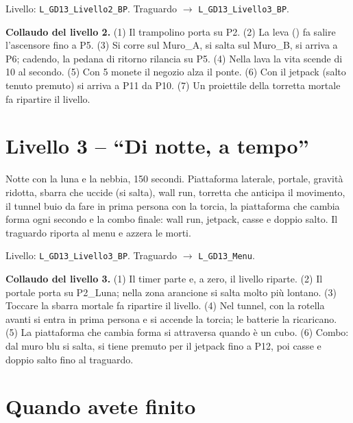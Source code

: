 \documentclass[a4paper,10pt]{article}
\newcommand{\var}[1]{\texttt{#1}}
\newcommand{\tasto}[1]{\fbox{\footnotesize\textsf{#1}}}
\begin{document}
Livello: \var{L\_GD13\_Livello2\_BP}. Traguardo $\rightarrow$ \var{L\_GD13\_Livello3\_BP}.



\textbf{Collaudo del livello 2.} (1) Il trampolino porta su P2. (2) La leva (\tasto{E}) fa salire l'ascensore fino a P5. (3) Si corre sul Muro\_A, si salta sul Muro\_B, si arriva a P6; cadendo, la pedana di ritorno rilancia su P5. (4) Nella lava la vita scende di 10 al secondo. (5) Con 5 monete il negozio alza il ponte. (6) Con il jetpack (salto tenuto premuto) si arriva a P11 da P10. (7) Un proiettile della torretta mortale fa ripartire il livello.

\section{Livello 3 -- ``Di notte, a tempo''}

Notte con la luna e la nebbia, 150 secondi. Piattaforma laterale, portale, gravità ridotta, sbarra che uccide (si salta), wall run, torretta che anticipa il movimento, il tunnel buio da fare in prima persona con la torcia, la piattaforma che cambia forma ogni secondo e la combo finale: wall run, jetpack, casse e doppio salto. Il traguardo riporta al menu e azzera le morti.

Livello: \var{L\_GD13\_Livello3\_BP}. Traguardo $\rightarrow$ \var{L\_GD13\_Menu}.



\textbf{Collaudo del livello 3.} (1) Il timer parte e, a zero, il livello riparte. (2) Il portale porta su P2\_Luna; nella zona arancione si salta molto più lontano. (3) Toccare la sbarra mortale fa ripartire il livello. (4) Nel tunnel, con la rotella avanti si entra in prima persona e si accende la torcia; le batterie la ricaricano. (5) La piattaforma che cambia forma si attraversa quando è un cubo. (6) Combo: dal muro blu si salta, si tiene premuto per il jetpack fino a P12, poi casse e doppio salto fino al traguardo.

\section{Quando avete finito}
\end{document}
